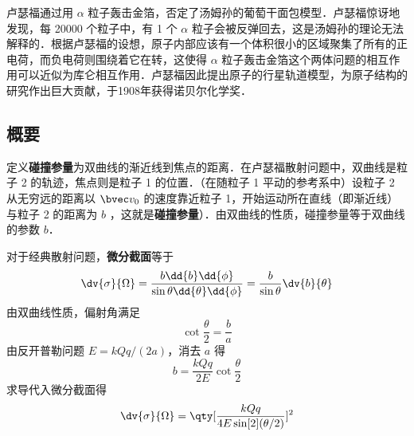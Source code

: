 
\begin{issues}
\issueDraft
\end{issues}


卢瑟福通过用 $\alpha$ 粒子轰击金箔，否定了汤姆孙的葡萄干面包模型．卢瑟福惊讶地发现，每 20000 个粒子中，有 1 个 $\alpha$ 粒子会被反弹回去，这是汤姆孙的理论无法解释的．根据卢瑟福的设想，原子内部应该有一个体积很小的区域聚集了所有的正电荷，而负电荷则围绕着它在转，这使得 $\alpha$ 粒子轰击金箔这个两体问题的相互作用可以近似为库仑相互作用．卢瑟福因此提出原子的行星轨道模型，为原子结构的研究作出巨大贡献，于1908年获得诺贝尔化学奖．
\subsection{概要}
定义\textbf{碰撞参量}为双曲线的渐近线到焦点的距离．在卢瑟福散射问题中，双曲线是粒子 2 的轨迹，焦点则是粒子 1 的位置．（在随粒子 1 平动的参考系中）设粒子 2 从无穷远的距离以 $\bvec v_0$ 的速度靠近粒子 1，开始运动所在直线（即渐近线）与粒子 2 的距离为 $b$ ，这就是\textbf{碰撞参量}）．由双曲线的性质，碰撞参量等于双曲线的参数 $b$．

对于经典散射问题，\textbf{微分截面}等于
\begin{equation}
\dv{\sigma}{\Omega} = \frac{b \dd{b}\dd{\phi} }{\sin \theta \dd{\theta} \dd{\phi} } = \frac{b}{\sin \theta }\dv{b}{\theta}
\end{equation}
由双曲线性质，偏射角满足
\begin{equation}
\cot{\frac{\theta }{2}}= \frac{b}{a}
\end{equation}
由反开普勒问题  $E = kQq/(2a)$，消去 $a$ 得
\begin{equation}
b = \frac{kQq}{2E}\cot {\frac{\theta }{2}}
\end{equation}
求导代入微分截面得
\begin{equation}\label{RuthSc_eq1}
\dv{\sigma}{\Omega} = \qty[ \frac{kQq}{4E \sin[2](\theta /2)} ]^2
\end{equation}


